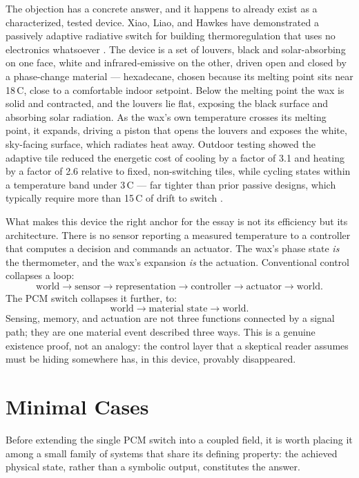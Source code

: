 \documentclass[11pt]{article}
\begin{document}
The objection has a concrete answer, and it happens to already exist as a characterized, tested device. Xiao, Liao, and Hawkes have demonstrated a passively adaptive radiative switch for building thermoregulation that uses no electronics whatsoever \cite{xiao2023}. The device is a set of louvers, black and solar-absorbing on one face, white and infrared-emissive on the other, driven open and closed by a phase-change material --- hexadecane, chosen because its melting point sits near 18\,\textdegree C, close to a comfortable indoor setpoint. Below the melting point the wax is solid and contracted, and the louvers lie flat, exposing the black surface and absorbing solar radiation. As the wax's own temperature crosses its melting point, it expands, driving a piston that opens the louvers and exposes the white, sky-facing surface, which radiates heat away. Outdoor testing showed the adaptive tile reduced the energetic cost of cooling by a factor of 3.1 and heating by a factor of 2.6 relative to fixed, non-switching tiles, while cycling states within a temperature band under 3\,\textdegree C --- far tighter than prior passive designs, which typically require more than 15\,\textdegree C of drift to switch \cite{xiao2023}.

What makes this device the right anchor for the essay is not its efficiency but its architecture. There is no sensor reporting a measured temperature to a controller that computes a decision and commands an actuator. The wax's phase state \emph{is} the thermometer, and the wax's expansion \emph{is} the actuation. Conventional control collapses a loop:
\[
\text{world} \to \text{sensor} \to \text{representation} \to \text{controller} \to \text{actuator} \to \text{world}.
\]
The PCM switch collapses it further, to:
\[
\text{world} \to \text{material state} \to \text{world}.
\]
Sensing, memory, and actuation are not three functions connected by a signal path; they are one material event described three ways. This is a genuine existence proof, not an analogy: the control layer that a skeptical reader assumes must be hiding somewhere has, in this device, provably disappeared.

\section{Minimal Cases}

Before extending the single PCM switch into a coupled field, it is worth placing it among a small family of systems that share its defining property: the achieved physical state, rather than a symbolic output, constitutes the answer.
\end{document}
